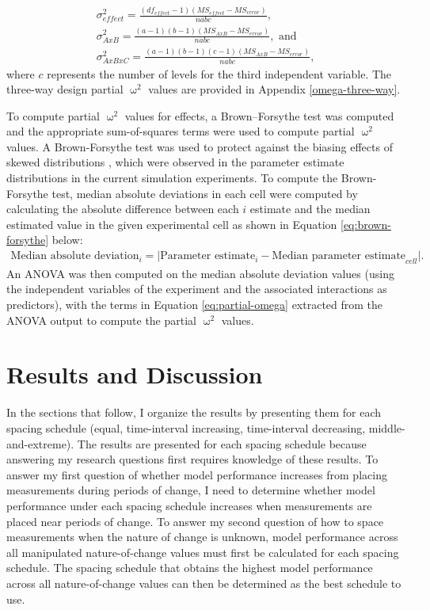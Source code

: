 \documentclass[
12pt, %
twoside,
english]{guelphthesis}
\begin{document}
\begin{align}
 \sigma^2_{effect} = \frac{(df_{effect} - 1)(MS_{effect} - MS_{error})}{nabc},
\label{eq:main-effect-three} \\ 
 \sigma^2_{A x B} = \frac{(a - 1)(b-1)(MS_{AxB} - MS_{error})}{nabc}, \text{ and } 
\label{eq:two-way-three} \\
 \sigma^2_{A x B x C} = \frac{(a - 1)(b-1)(c-1)(MS_{AxB} - MS_{error})}{nabc}, 
\label{eq:three-way-three}
\end{align}
\noindent where \(c\) represents the number of levels for the third independent variable. The three-way design partial \(\upomega^2\) values are provided in Appendix \ref{omega-three-way}.

To compute partial \(\upomega^2\) values for effects, a Brown--Forsythe test was computed and the appropriate sum-of-squares terms were used to compute partial \(\upomega^2\) values. A Brown-Forsythe test was used to protect against the biasing effects of skewed distributions \autocite{brown1974}, which were observed in the parameter estimate distributions in the current simulation experiments. To compute the Brown-Forsythe test, median absolute deviations in each cell were computed by calculating the absolute difference between each \(i\) estimate and the median estimated value in the given experimental cell as shown in Equation \ref{eq:brown-forsythe} below:
\begin{align}
\text{Median absolute deviation}_i = \lvert \text{Parameter estimate}_i - \text{Median parameter estimate}_{cell} \rvert.
\label{eq:brown-forsythe}
\end{align}
\noindent An ANOVA was then computed on the median absolute deviation values (using the independent variables of the experiment and the associated interactions as predictors), with the terms in Equation \ref{eq:partial-omega} extracted from the ANOVA output to compute the partial \(\upomega^2\) values.

\hypertarget{results-and-discussion}{%
\section{Results and Discussion}\label{results-and-discussion}}

In the sections that follow, I organize the results by presenting them for each spacing schedule (equal, time-interval increasing, time-interval decreasing, middle-and-extreme). The results are presented for each spacing schedule because answering my research questions first requires knowledge of these results. To answer my first question of whether model performance increases from placing measurements during periods of change, I need to determine whether model performance under each spacing schedule increases when measurements are placed near periods of change. To answer my second question of how to space measurements when the nature of change is unknown, model performance across all manipulated nature-of-change values must first be calculated for each spacing schedule. The spacing schedule that obtains the highest model performance across all nature-of-change values can then be determined as the best schedule to use.
\end{document}
